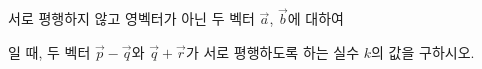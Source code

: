 서로 평행하지 않고 영벡터가 아닌 두 벡터 $\vec{a}$, $\vec{b}$에 대하여 \par\smallskip{}\par\smallskip\noindent 일 때, 두 벡터 $\vec{p}-\vec{q}$와 $\vec{q}+\vec{r}$가 서로 평행하도록 하는 실수 $k$의 값을 구하시오.
